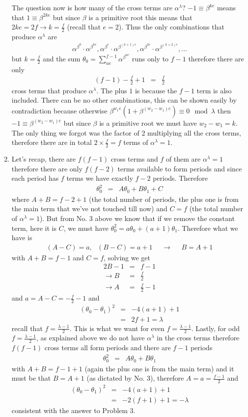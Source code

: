 \documentclass[aps,preprint,preprintnumbers,nofootinbib,showpacs,prd]{revtex4-1}
\newcommand{\nbea}{\begin{eqnarray*}}
\newcommand{\neea}{\end{eqnarray*}}
\begin{document}
\begin{enumerate}
The question now is how many of the cross terms are $\alpha^{\lambda}$? $-1 \equiv \beta^{ke}$ means that $1 \equiv \beta^{2ke}$ but since $\beta$ is a primitive root this means that $2ke = 2f \to k = \frac{f}{2}$ (recall that $e=2$). Thus the only combinations that produce $\alpha^\lambda$ are
%
\nbea
\alpha^{\beta^0} \cdot \alpha^{\beta^{ke}}, \alpha^{\beta^e} \cdot \alpha^{\beta^{(k+1)e}}, \alpha^{\beta^{2e}} \cdot \alpha^{\beta^{(k+2)e}}, \dots  
\neea
%
but $k = \frac{f}{2}$ and the sum $\theta_0 = \sum_{ue}^{f-1} \alpha^{\beta^{ue}}$ runs only to $f-1$ therefore there are only
%
\nbea
(f-1) - \frac{f}{2} + 1 & = & \frac{f}{2}
\neea
%
cross terms that produce $\alpha^\lambda$. The plus $1$ is because the $f-1$ term is also included. There can be no other combinations, this can be shown easily by contradiction because otherwise $\beta^{w_1 e}(1 + \beta^{(w_2 - w_1) e}) \equiv 0 \mod{\lambda}$ then $-1 \equiv \beta^{(w_2 - w_1)e}$ but since $\beta$ is a primitive root we must have $w_2 - w_1 = k$. The only thing we forgot was the factor of 2 multiplying all the cross terms, therefore there are in total $2 \times \frac{f}{2} = f$ terms of $\alpha^{\lambda} = 1$.
%
\item Let's recap, there are $f(f-1)$ cross terms and $f$ of them are $\alpha^{\lambda} = 1$ therefore there are only $f(f - 2)$ terms available to form periods and since each period has $f$ terms we have exactly $f-2$ periods. Therefore
%
\nbea
\theta_0^2 & = & A\theta_0 + B\theta_1 + C
\neea
%
where $A + B = f - 2 + 1$ (the total number of periods, the plus one is from the main term that we've not touched till now) and $C = f$ (the total number of $\alpha^\lambda = 1$). But from No. 3 above we know that if we remove the constant term, here it is $C$, we must have $\theta_0^2 = a\theta_0 + (a+1)\theta_1$. Therefore what we have is
%
\nbea
(A - C) = a,~~~ (B - C) = a + 1 ~~~~~~\to ~~~~~~ B = A + 1
\neea
%
with $A + B = f - 1$ and $C = f$, solving we get
%
\nbea
2B - 1 & = & f - 1 \\
\to B & = & \frac{f}{2} \\
\to A & = & \frac{f}{2} - 1
\neea
% 
and $a = A - C = -\frac{f}{2} - 1$ and
%
\nbea
(\theta_0 - \theta_1)^2 & = & -4(a + 1) + 1 \\
& = & 2 f + 1 = \lambda
\neea
%
recall that $f = \frac{\lambda - 1}{2}$. This is what we want for even $f = \frac{\lambda - 1}{2}$. Lastly, for odd $f = \frac{\lambda - 1}{2}$, as explained above we do not have $\alpha^\lambda$ in the cross terms therefore $f(f-1)$ cross terms all form periods and there are $f - 1$ periods
%
\nbea
\theta_0^2 & = & A\theta_0 + B\theta_1
\neea
%
with $A + B = f - 1 + 1$ (again the plus one is from the main term) and it must be that $B = A + 1$ (as dictated by No. 3), therefore $A = a = \frac{f - 1}{2}$ and
%
\nbea
(\theta_0 - \theta_1)^2 & = & -4(a + 1) + 1 \\
& = & -2 (f+1) + 1 = -\lambda
\neea
%
consistent with the answer to Problem 3.
%
\end{enumerate} 
%
\end{document}
